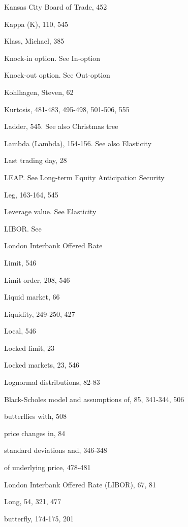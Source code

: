 \noindent Kansas City Board of Trade, 452\par
\noindent Kappa (K), 110, 545\par
\noindent Klass, Michael, 385\par
\noindent Knock-in option. See In-option\par
\noindent Knock-out option. See Out-option\par
\noindent Kohlhagen, Steven, 62\par
\noindent Kurtosis, 481-483, 495-498, 501-506, 555\par
\noindent Ladder, 545. See also Christmas tree\par
\noindent Lambda (Lambda), 154-156. See also Elasticity\par
\noindent Last trading day, 28\par
\noindent LEAP. See Long-term Equity Anticipation Security\par
\noindent Leg, 163-164, 545\par
\noindent Leverage value. See Elasticity\par
\noindent LIBOR. See\par
\noindent London Interbank Offered Rate\par
\noindent Limit, 546\par
\noindent Limit order, 208, 546\par
\noindent Liquid market, 66\par
\noindent Liquidity, 249-250, 427\par
\noindent Local, 546\par
\noindent Locked limit, 23\par
\noindent Locked markets, 23, 546\par
\noindent Lognormal distributions, 82-83\par
Black-Scholes model and assumptions of, 85, 341-344, 506\par
\noindent butterflies with, 508\par
\noindent price changes in, 84\par
\noindent standard deviations and, 346-348\par
\noindent of underlying price, 478-481\par
\noindent London Interbank Offered Rate (LIBOR), 67, 81\par
\noindent Long, 54, 321, 477\par
\noindent butterfly, 174-175, 201\par

